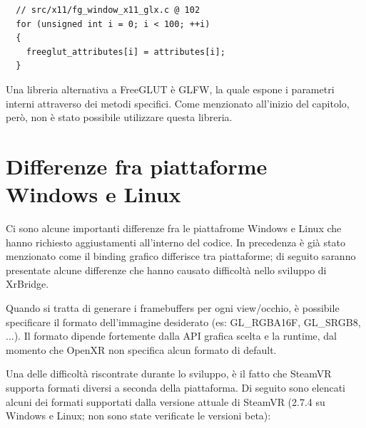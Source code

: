 \documentclass[twoside]{supsistudent}
\begin{document}
\begin{verbatim}
  // src/x11/fg_window_x11_glx.c @ 102
  for (unsigned int i = 0; i < 100; ++i)
  {
    freeglut_attributes[i] = attributes[i];
  }
\end{verbatim}

Una libreria alternativa a FreeGLUT è GLFW, la quale espone i parametri interni attraverso dei metodi specifici. Come menzionato all'inizio del capitolo, però, non è stato possibile utilizzare questa libreria.

\section{Differenze fra piattaforme Windows e Linux}

Ci sono alcune importanti differenze fra le piattafrome Windows e Linux che hanno richiesto aggiustamenti all'interno del codice. In precedenza è già stato menzionato come il binding grafico differisce tra piattaforme; di seguito saranno presentate alcune differenze che hanno causato difficoltà nello sviluppo di XrBridge.

Quando si tratta di generare i framebuffers per ogni view/occhio, è possibile specificare il formato dell'immagine desiderato (es: GL\_RGBA16F, GL\_SRGB8, ...). Il formato dipende fortemente dalla API grafica scelta e la runtime, dal momento che OpenXR non specifica alcun formato di default.

Una delle difficoltà riscontrate durante lo sviluppo, è il fatto che SteamVR supporta formati diversi a seconda della piattaforma. Di seguito sono elencati alcuni dei formati supportati dalla versione attuale di SteamVR (2.7.4 su Windows e Linux; non sono state verificate le versioni beta):
\end{document}
